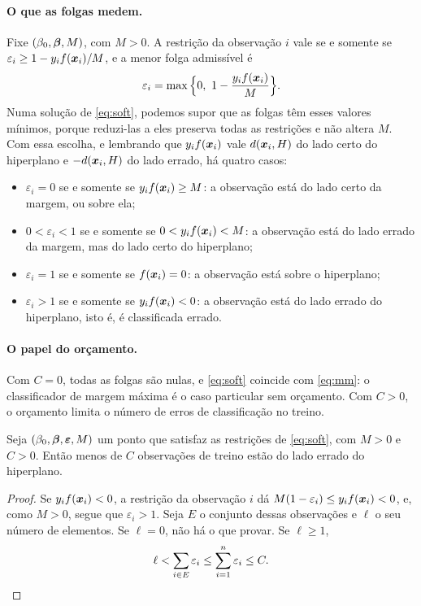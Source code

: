 \documentclass[11pt,a4paper]{article}
\begin{document}
\paragraph{O que as folgas medem.} Fixe $(\beta_0,\bm{\beta},M)$, com $M>0$. A restrição
da observação $i$ vale se e somente se $\varepsilon_i\ge1-y_if(\bm{x}_i)/M$, e a menor
folga admissível é
\[
  \varepsilon_i=\max\Big\{0,\ 1-\frac{y_if(\x_i)}{M}\Big\}.
\]
Numa solução de \eqref{eq:soft}, podemos supor que as folgas têm esses valores
mínimos, porque reduzi-las a eles preserva todas as restrições e não altera $M$. Com
essa escolha, e lembrando que $y_if(\bm{x}_i)$ vale $d(\bm{x}_i,H)$ do lado certo do hiperplano
e $-d(\bm{x}_i,H)$ do lado errado, há quatro casos:
\begin{itemize}[leftmargin=1.4cm]
  \item $\varepsilon_i=0$ se e somente se $y_if(\bm{x}_i)\ge M$: a observação está do lado
        certo da margem, ou sobre ela;
  \item $0<\varepsilon_i<1$ se e somente se $0<y_if(\bm{x}_i)<M$: a observação está do
        lado errado da margem, mas do lado certo do hiperplano;
  \item $\varepsilon_i=1$ se e somente se $f(\bm{x}_i)=0$: a observação está sobre o
        hiperplano;
  \item $\varepsilon_i>1$ se e somente se $y_if(\bm{x}_i)<0$: a observação está do lado
        errado do hiperplano, isto é, é classificada errado.
\end{itemize}

\paragraph{O papel do orçamento.} Com $C=0$, todas as folgas são nulas, e
\eqref{eq:soft} coincide com \eqref{eq:mm}: o classificador de margem máxima é o caso
particular sem orçamento. Com $C>0$, o orçamento limita o número de erros de
classificação no treino.

\begin{proposicao}\label{prop:erros}
Seja $(\beta_0,\bm{\beta},\bm\varepsilon,M)$ um ponto que satisfaz as restrições de
\eqref{eq:soft}, com $M>0$ e $C>0$. Então menos de $C$ observações de treino estão do
lado errado do hiperplano.
\end{proposicao}
\begin{proof}
Se $y_if(\bm{x}_i)<0$, a restrição da observação $i$ dá
$M(1-\varepsilon_i)\le y_if(\bm{x}_i)<0$, e, como $M>0$, segue que $\varepsilon_i>1$. Seja
$E$ o conjunto dessas observações e $\ell$ o seu número de elementos. Se $\ell=0$, não
há o que provar. Se $\ell\ge1$,
\[
  \ell<\sum_{i\in E}\varepsilon_i\le\sum_{i=1}^n\varepsilon_i\le C. \qedhere
\]
\end{proof}
\end{document}
